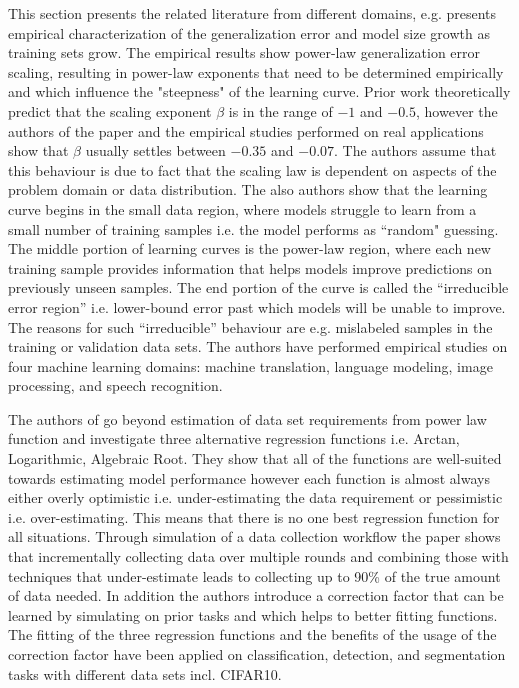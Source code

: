 \documentclass{article} %
\begin{document}
This section presents the related literature from different domains, e.g. \cite{hestness2017deep} presents empirical characterization of the generalization error and model size growth as training sets grow.  The empirical results show power-law generalization error scaling, resulting in power-law exponents that need to be determined empirically and which influence the "steepness" of the learning curve. Prior work theoretically predict that the scaling exponent $\beta$ is in the range of $-1$ and $-0.5$, however the authors of the paper and the empirical studies performed on real applications show that $\beta$ usually settles between $-0.35$ and $-0.07$. The authors assume that this behaviour is due to fact that the scaling law is dependent on aspects of the problem domain or data distribution. The also authors show that the learning curve begins in the small data region, where models struggle to learn from a small number of training samples i.e. the model performs as “random" guessing. The middle portion of learning curves is the power-law region, where each new training sample provides information that helps models improve predictions on previously unseen samples. The end portion of the curve is called the “irreducible error region” i.e. lower-bound error past which models will be unable to improve. The reasons for such “irreducible” behaviour are e.g. mislabeled samples in the training or validation data sets. The authors have performed empirical studies on four machine learning domains: machine translation, language modeling, image processing, and speech recognition.

The authors of \cite{mahmood2022data} go beyond estimation of data set requirements from power law function and investigate three alternative regression functions i.e. Arctan, Logarithmic, Algebraic Root. They show that all of the functions are well-suited towards estimating model performance however each function is almost always either overly optimistic i.e. under-estimating the data requirement or pessimistic i.e. over-estimating. This means that there is no one best regression function for all situations. Through simulation of a data collection workflow the paper shows that incrementally collecting data over multiple rounds and combining those with techniques that under-estimate leads to collecting up to 90\% of the true amount of data needed. In addition the authors introduce a correction factor that can be learned by simulating on prior tasks and which helps to better fitting functions. The fitting of the three regression functions and the benefits of the usage of the correction factor have been applied on classification, detection, and segmentation tasks with different data sets incl. CIFAR10.
\end{document}
